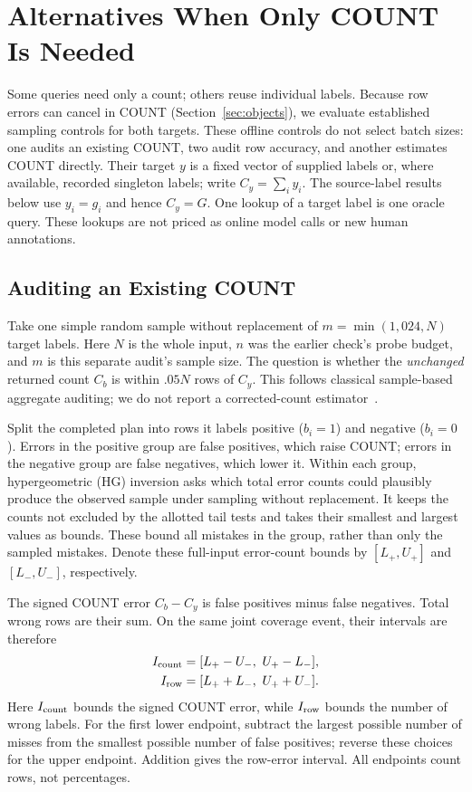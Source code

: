 \section{Alternatives When Only COUNT Is Needed}
\label{sec:finite}
Some queries need only a count; others reuse individual labels. Because row errors can cancel in COUNT (Section~\ref{sec:objects}), we evaluate established sampling controls for both targets. These offline controls do not select batch sizes: one audits an existing COUNT, two audit row accuracy, and another estimates COUNT directly. Their target $y$ is a fixed vector of supplied labels or, where available, recorded singleton labels; write $C_y=\sum_i y_i$. The source-label results below use $y_i=g_i$ and hence $C_y=G$. One lookup of a target label is one oracle query. These lookups are not priced as online model calls or new human annotations.

\subsection{Auditing an Existing COUNT}
Take one simple random sample without replacement of $m=\min(1,024,N)$ target labels. Here $N$ is the whole input, $n$ was the earlier check's probe budget, and $m$ is this separate audit's sample size. The question is whether the \emph{unchanged} returned count $C_b$ is within $.05N$ rows of $C_y$. This follows classical sample-based aggregate auditing; we do not report a corrected-count estimator~\cite{sampleclean,blazeit}.

Split the completed plan into rows it labels positive ($b_i=1$) and negative ($b_i=0$). Errors in the positive group are false positives, which raise COUNT; errors in the negative group are false negatives, which lower it. Within each group, hypergeometric (HG) inversion asks which total error counts could plausibly produce the observed sample under sampling without replacement. It keeps the counts not excluded by the allotted tail tests and takes their smallest and largest values as bounds. These bound all mistakes in the group, rather than only the sampled mistakes. Denote these full-input error-count bounds by $[L_+,U_+]$ and $[L_-,U_-]$, respectively.

The signed COUNT error $C_b-C_y$ is false positives minus false negatives. Total wrong rows are their sum. On the same joint coverage event, their intervals are therefore
\begin{equation}
\begin{aligned}
I_{\rm count}&=[L_+-U_-,\ U_+-L_-],\\
I_{\rm row}&=[L_++L_-,\ U_++U_-].
\end{aligned}
\label{eq:count_bounds}
\end{equation}
Here $I_{\rm count}$ bounds the signed COUNT error, while $I_{\rm row}$ bounds the number of wrong labels. For the first lower endpoint, subtract the largest possible number of misses from the smallest possible number of false positives; reverse these choices for the upper endpoint. Addition gives the row-error interval. All endpoints count rows, not percentages.

